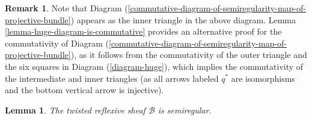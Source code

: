 \documentclass[12pt]{amsart}
\numberwithin{equation}{subsection}
\theoremstyle{plain}
\newtheorem{lem}[thm]{Lemma}
\theoremstyle{definition}
\newtheorem{rem}[thm]{Remark}
\newcommand{\B}{{\mathcal B}}
\begin{document}
\begin{rem}
\label{remark-commutativity-of-diagram-of-semiregularity-map-of-projective-bundle}
Note that Diagram (\ref{commutative-diagram-of-semiregularity-map-of-projective-bundle}) appears as the inner triangle in the above diagram. 
Lemma \ref{lemma-huge-diagram-is-commutative} provides an alternative proof for the commutativity of Diagram (\ref{commutative-diagram-of-semiregularity-map-of-projective-bundle}), as it
follows from the commutativity of the outer triangle and the six squares in Diagram (\ref{diagram-huge}), which implies the commutativity of the intermediate and inner triangles (as all arrows labeled $q^*$ are isomorphisms and the bottom vertical arrow is injective). 
\end{rem}

\begin{lem}
\label{lemma-semiregularity-of-twisted-sheaf-B}
The twisted reflexive sheaf $\B$ is semiregular.
\end{lem}
\end{document}
